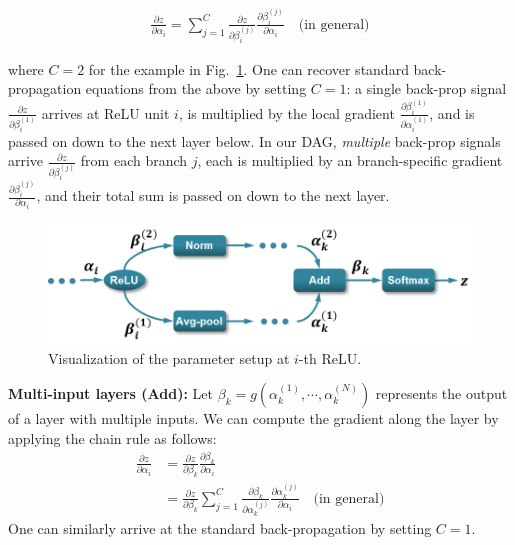 \documentclass[10pt,twocolumn,letterpaper]{article}
\begin{document}
\begin{align}
\frac{\partial z}{\partial \alpha_i}=\sum_{j=1}^{C}\frac{\partial z}{\partial \beta_i^{(j)}}\frac{\partial \beta_i^{(j)}}{\partial \alpha_i} \quad \text {(in general)} \label{eq:backprop1}
\end{align}

\noindent where $C=2$ for the example in Fig.~\ref{fig:backprop_eq}. One can recover standard back-propagation equations from the above by setting $C=1$: a single back-prop signal $\frac{\partial z}{\partial \beta_i^{(1)}}$  arrives at ReLU unit $i$, is multiplied by the local gradient $\frac{\partial \beta_i^{(1)}}{\partial \alpha_i^{(1)}}$, and is passed on down to the next layer below. In our DAG, {\em multiple} back-prop signals arrive $\frac{\partial z}{\partial \beta_i^{(j)}}$ from each branch $j$, each is multiplied by an branch-specific gradient $\frac{\partial \beta_i^{(j)}}{\partial \alpha_i}$, and their total sum is passed on down to the next layer.


\begin{figure}[htbp]
\centering
	\includegraphics[width=\columnwidth]{fig/fig_backprop_eq.png}
\caption{Visualization of the parameter setup at $i$-th ReLU.}

\label{fig:backprop_eq}
\end{figure}


{\bf Multi-input layers (Add):} Let $\beta_k=g(\alpha^{(1)}_k,\cdots,\alpha^{(N)}_k)$ represents the output of a layer with multiple inputs. We can compute the gradient along the layer by applying the chain rule as follows:
\begin{align}
\frac{\partial z}{\partial \alpha_i}&=\frac{\partial z}{\partial \beta_k}\frac{\partial \beta_k}{\partial \alpha_i} \nonumber \\
&=\frac{\partial z}{\partial \beta_k}\sum_{j=1}^{C}\frac{\partial \beta_k}{\partial \alpha_k^{(j)}}\frac{\partial \alpha_k^{(j)}}{\partial \alpha_i} \quad \text{(in general)} \label{eq:backprop2}
\end{align} 
One can similarly arrive at the standard back-propagation by setting $C=1$.
\end{document}
